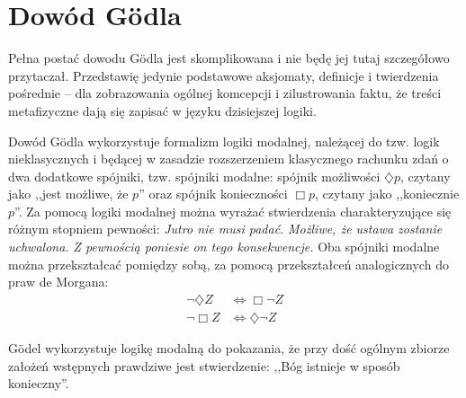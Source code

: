\documentclass[
    showauthor=true,   %
    showsubject=false, %
    showdate=true,     %
    hyphenation=true   %
]{src/wut-report}
\begin{document}
\section{Dowód G\"odla}
Pełna postać dowodu G\"odla jest skomplikowana i nie będę jej tutaj szczegółowo przytaczał. Przedstawię jedynie podstawowe aksjomaty, definicje i twierdzenia pośrednie -- dla zobrazowania ogólnej komcepcji i zilustrowania faktu, że treści metafizyczne dają się zapisać w języku dzisiejszej logiki.

Dowód G\"odla wykorzystuje formalizm logiki modalnej, należącej do tzw. logik nieklasycznych i będącej w zasadzie rozszerzeniem klasycznego rachunku zdań o dwa dodatkowe spójniki, tzw. spójniki modalne: spójnik możliwości $\diamondsuit p$, czytany jako ,,jest możliwe, że $p$'' oraz spójnik konieczności $\Box p$, czytany jako ,,koniecznie $p$''. Za pomocą logiki modalnej można wyrażać stwierdzenia charakteryzujące się różnym stopniem pewności: \emph{Jutro nie musi padać.} \emph{Możliwe, że ustawa zostanie uchwalona.} \emph{Z pewnością poniesie on tego konsekwencje. } Oba spójniki modalne można przekształcać pomiędzy sobą, za pomocą przekształceń analogicznych do praw de Morgana:
\begin{align*}
\neg \diamondsuit Z & \Leftrightarrow \Box \neg Z \\
\neg \Box Z & \Leftrightarrow \diamondsuit \neg Z
\end{align*}

G\"odel wykorzystuje logikę modalną do pokazania, że przy dość ogólnym zbiorze założeń wstępnych prawdziwe jest stwierdzenie: ,,Bóg istnieje w sposób konieczny''.
\end{document}
